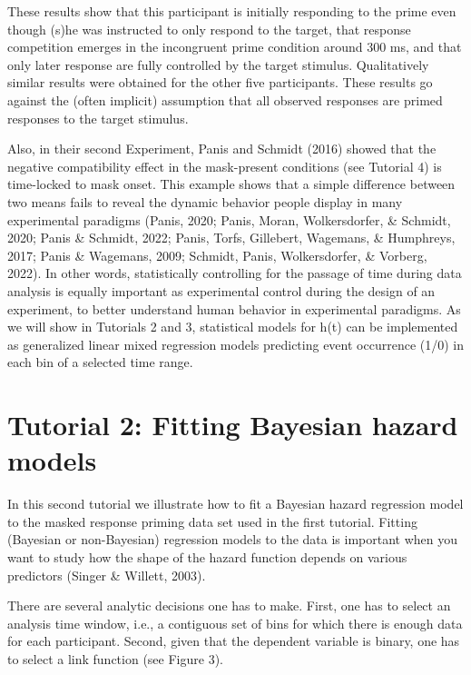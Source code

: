 \documentclass[
  man,floatsintext]{apa6}
\begin{document}
These results show that this participant is initially responding to the prime even though (s)he was instructed to only respond to the target, that response competition emerges in the incongruent prime condition around 300 ms, and that only later response are fully controlled by the target stimulus. Qualitatively similar results were obtained for the other five participants. These results go against the (often implicit) assumption that all observed responses are primed responses to the target stimulus.

Also, in their second Experiment, Panis and Schmidt (2016) showed that the negative compatibility effect in the mask-present conditions (see Tutorial 4) is time-locked to mask onset. This example shows that a simple difference between two means fails to reveal the dynamic behavior people display in many experimental paradigms (Panis, 2020; Panis, Moran, Wolkersdorfer, \& Schmidt, 2020; Panis \& Schmidt, 2022; Panis, Torfs, Gillebert, Wagemans, \& Humphreys, 2017; Panis \& Wagemans, 2009; Schmidt, Panis, Wolkersdorfer, \& Vorberg, 2022). In other words, statistically controlling for the passage of time during data analysis is equally important as experimental control during the design of an experiment, to better understand human behavior in experimental paradigms. As we will show in Tutorials 2 and 3, statistical models for h(t) can be implemented as generalized linear mixed regression models predicting event occurrence (1/0) in each bin of a selected time range.

\section{Tutorial 2: Fitting Bayesian hazard models}\label{tutorial-2-fitting-bayesian-hazard-models}

In this second tutorial we illustrate how to fit a Bayesian hazard regression model to the masked response priming data set used in the first tutorial. Fitting (Bayesian or non-Bayesian) regression models to the data is important when you want to study how the shape of the hazard function depends on various predictors (Singer \& Willett, 2003).

There are several analytic decisions one has to make. First, one has to select an analysis time window, i.e., a contiguous set of bins for which there is enough data for each participant. Second, given that the dependent variable is binary, one has to select a link function (see Figure 3).
\end{document}
